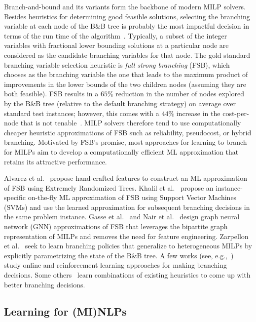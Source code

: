 \documentclass{article}
\begin{document}
Branch-and-bound and its variants form the backbone of modern MILP solvers.
Besides heuristics for determining good feasible solutions, selecting the branching variable at each node of the B\&B tree is probably the most impactful decision in terms of the run time of the algorithm~\cite{achterberg2007constraint}.
Typically, a subset of the integer variables with fractional lower bounding solutions at a particular node are considered as the candidate branching variables for that node.
The gold standard branching variable selection heuristic is {\it full strong branching} (FSB), which chooses as the branching variable the one that leads to the maximum product of improvements in the lower bounds of the two children nodes (assuming they are both feasible).
FSB results in a $65\%$ reduction in the number of nodes explored by the B\&B tree (relative to the default branching strategy) on average over standard test instances; however, this comes with a $44\%$ increase in the cost-per-node that is not tenable~\cite{achterberg2007constraint}.
MILP solvers therefore tend to use computationally cheaper heuristic approximations of FSB such as reliability, pseudocost, or hybrid branching.
Motivated by FSB's promise, most approaches for learning to branch for MILPs aim to develop a computationally efficient ML approximation that retains its attractive performance.


Alvarez et al.\ \cite{alvarez2017machine} propose hand-crafted features to construct an ML approximation of FSB using Extremely Randomized Trees.
Khalil et al.\ \cite{khalil2016learning} propose an instance-specific on-the-fly ML approximation of FSB using Support Vector Machines (SVMs) and use the learned approximation for subsequent branching decisions in the same problem instance.
Gasse et al.\ \cite{gasse2019exact} and Nair et al.\ \cite{nair2020solving} design graph neural network (GNN) approximations of FSB that leverages the bipartite graph representation of MILPs and removes the need for feature engineering.
Zarpellon et al.\ \cite{zarpellon2021parameterizing} seek to learn branching policies that generalize to heterogeneous MILPs by explicitly parametrizing the state of the B\&B tree.
A few works (see, e.g.,~\cite{etheve2020reinforcement,he2014learning}) study online and reinforcement learning approaches for making branching decisions.
Some others~\cite{balcan2018learning,di2016dash} learn combinations of existing heuristics to come up with better branching decisions.




\subsection{Learning for (MI)NLPs}
\label{subsec:learning_minlps}
\end{document}

